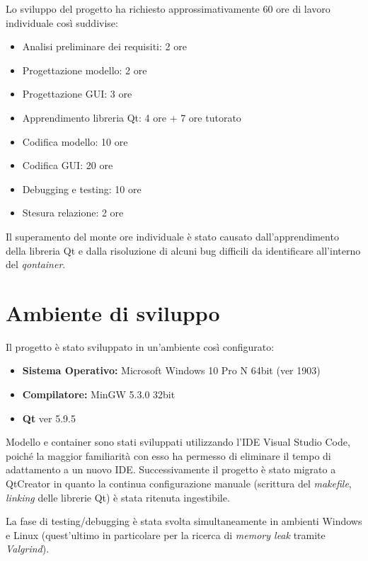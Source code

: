 \documentclass[
]{article}
\providecommand{\tightlist}{%
  \setlength{\itemsep}{0pt}\setlength{\parskip}{0pt}}
\begin{document}
Lo sviluppo del progetto ha richiesto approssimativamente 60 ore di
lavoro individuale così suddivise:

\begin{itemize}
\tightlist
\item
  Analisi preliminare dei requisiti: 2 ore
\item
  Progettazione modello: 2 ore
\item
  Progettazione GUI: 3 ore
\item
  Apprendimento libreria Qt: 4 ore + 7 ore tutorato
\item
  Codifica modello: 10 ore
\item
  Codifica GUI: 20 ore
\item
  Debugging e testing: 10 ore
\item
  Stesura relazione: 2 ore
\end{itemize}

Il superamento del monte ore individuale è stato causato
dall'apprendimento della libreria Qt e dalla risoluzione di alcuni bug
difficili da identificare all'interno del \emph{qontainer}.

\hypertarget{ambiente-di-sviluppo}{%
\section{Ambiente di sviluppo}\label{ambiente-di-sviluppo}}

Il progetto è stato sviluppato in un'ambiente così configurato:

\begin{itemize}
\tightlist
\item
  \textbf{Sistema Operativo:} Microsoft Windows 10 Pro N 64bit (ver
  1903)
\item
  \textbf{Compilatore:} MinGW 5.3.0 32bit
\item
  \textbf{Qt} ver 5.9.5
\end{itemize}

Modello e container sono stati sviluppati utilizzando l'IDE Visual
Studio Code, poiché la maggior familiarità con esso ha permesso di
eliminare il tempo di adattamento a un nuovo IDE. Successivamente il
progetto è stato migrato a QtCreator in quanto la continua
configurazione manuale (scrittura del \emph{makefile}, \emph{linking}
delle librerie Qt) è stata ritenuta ingestibile.

La fase di testing/debugging è stata svolta simultaneamente in ambienti
Windows e Linux (quest'ultimo in particolare per la ricerca di
\emph{memory leak} tramite \emph{Valgrind}).
\end{document}
